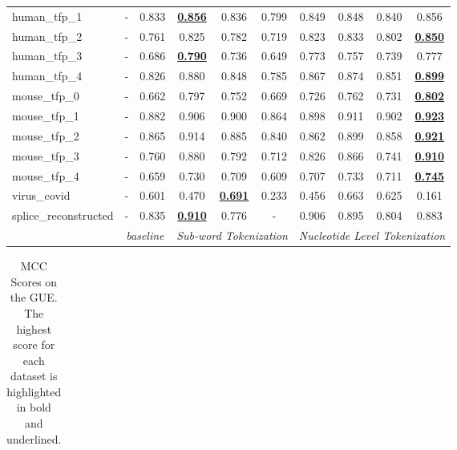 \begin{table*}[h!]
\begin{center}
\begin{tabular}{l|cc|ccc|cccc}
human\_tfp\_1 & - & 0.833 & {\ul \textbf{0.856}} & 0.836 & 0.799 & 0.849 & 0.848 & 0.840 & 0.856 \\
human\_tfp\_2 & - & 0.761 & 0.825 & 0.782 & 0.719 & 0.823 & 0.833 & 0.802 & {\ul \textbf{0.850}} \\
human\_tfp\_3 & - & 0.686 & {\ul \textbf{0.790}} & 0.736 & 0.649 & 0.773 & 0.757 & 0.739 & 0.777 \\
human\_tfp\_4 & - & 0.826 & 0.880 & 0.848 & 0.785 & 0.867 & 0.874 & 0.851 & {\ul \textbf{0.899}} \\
mouse\_tfp\_0 & - & 0.662 & 0.797 & 0.752 & 0.669 & 0.726 & 0.762 & 0.731 & {\ul \textbf{0.802}} \\
mouse\_tfp\_1 & - & 0.882 & 0.906 & 0.900 & 0.864 & 0.898 & 0.911 & 0.902 & {\ul \textbf{0.923}} \\
mouse\_tfp\_2 & - & 0.865 & 0.914 & 0.885 & 0.840 & 0.862 & 0.899 & 0.858 & {\ul \textbf{0.921}} \\
mouse\_tfp\_3 & - & 0.760 & 0.880 & 0.792 & 0.712 & 0.826 & 0.866 & 0.741 & {\ul \textbf{0.910}} \\
mouse\_tfp\_4 & - & 0.659 & 0.730 & 0.709 & 0.609 & 0.707 & 0.733 & 0.711 & {\ul \textbf{0.745}} \\
virus\_covid & - & 0.601 & 0.470 & {\ul \textbf{0.691}} & 0.233 & 0.456 & 0.663 & 0.625 & 0.161 \\
splice\_reconstructed & - & 0.835 & {\ul \textbf{0.910}} & 0.776 & - & 0.906 & 0.895 & 0.804 & 0.883 \\
\hline
\multicolumn{1}{l|}{} & \multicolumn{2}{c|}{\textit{baseline}} & \multicolumn{3}{c|}{\textit{Sub-word Tokenization}} & \multicolumn{4}{c}{\textit{Nucleotide Level Tokenization}} \\ \hline
\end{tabular}
\end{center}
\end{table*}\begin{table*}[h!]
\small
\begin{center}
\caption{MCC Scores on the GUE. The highest score for each dataset is highlighted in bold and underlined.}
\label{table: GUE Results MCC}
\begin{tabular}{l|cc|ccc|cccc}
\hline

\end{tabular}
\end{center}
\end{table*}
